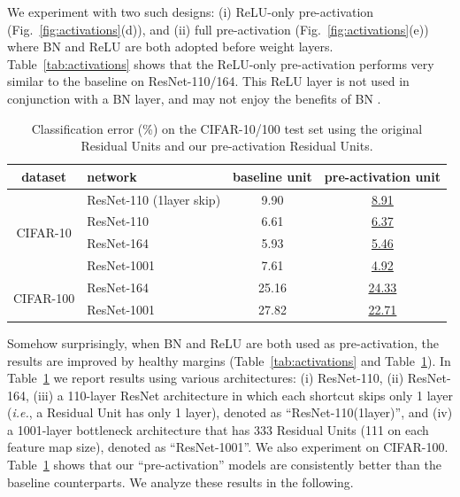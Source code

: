 \documentclass[runningheads]{llncs}
\def\ie{\emph{i.e.}}
\begin{document}
We experiment with two such designs: (i) ReLU-only pre-activation (Fig.~\ref{fig:activations}(d)), and (ii) full pre-activation (Fig.~\ref{fig:activations}(e)) where BN and ReLU are both adopted before weight layers. Table~\ref{tab:activations} shows that the ReLU-only pre-activation performs very similar to the baseline on ResNet-110/164. This ReLU layer is not used in conjunction with a BN layer, and may not enjoy the benefits of BN \cite{Ioffe2015}.


\renewcommand\arraystretch{1.3}
\setlength{\tabcolsep}{4pt}
\begin{table}[t]
\caption{Classification error (\%) on the CIFAR-10/100 test set using the original Residual Units and our pre-activation Residual Units.}\label{tab:preact}
\centering
\fontsize{8pt}{1em}\selectfont
\begin{tabular}{c|l|c|c}
\hline
dataset & network & baseline unit & pre-activation unit \\
\hline
\multirow{4}{*}{CIFAR-10}
& ResNet-110 (1layer skip) & 9.90 & \underline{8.91}\\
& ResNet-110 & 6.61 & \underline{6.37}\\
& ResNet-164 & 5.93 & \underline{5.46}\\
& ResNet-1001 & 7.61 & \underline{4.92}\\
\hline
\multirow{2}{*}{CIFAR-100}
& ResNet-164 & 25.16 & \underline{24.33}\\
& ResNet-1001 & 27.82  & \underline{22.71}\\
\hline
\end{tabular}
\end{table}

Somehow surprisingly, when BN and ReLU are both used as pre-activation, the results are improved by healthy margins (Table~\ref{tab:activations} and Table~\ref{tab:preact}). In Table~\ref{tab:preact} we report results using various architectures: (i) ResNet-110, (ii) ResNet-164, (iii) a 110-layer ResNet architecture in which each shortcut skips only 1 layer (\ie, a Residual Unit has only 1 layer), denoted as ``ResNet-110(1layer)'', and (iv) a 1001-layer bottleneck architecture that has 333 Residual Units (111 on each feature map size), denoted as ``ResNet-1001''. We also experiment on CIFAR-100. Table~\ref{tab:preact} shows that our ``pre-activation'' models are consistently better than the baseline counterparts. We analyze these results in the following.
\end{document}
